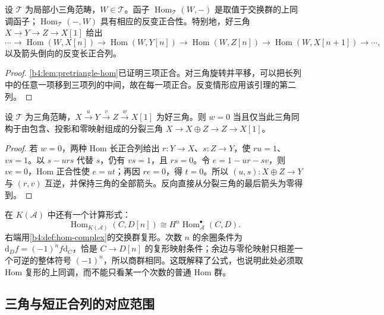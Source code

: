 \begin{proposition}\label{b4:prop:triangle-hom-exact}
设 \(\mathcal T\) 为局部小三角范畴，\(W\in\mathcal T\)。函子 \(\operatorname{Hom}_{\mathcal T}(W,-)\) 是取值于交换群的上同调函子；\(\operatorname{Hom}_{\mathcal T}(-,W)\) 具有相应的反变正合性。特别地，好三角 \(X\to Y\to Z\to X[1]\) 给出
\[
 \cdots\to\operatorname{Hom}(W,X[n])\to\operatorname{Hom}(W,Y[n])
 \to\operatorname{Hom}(W,Z[n])\to\operatorname{Hom}(W,X[n+1])\to\cdots,
\]
以及箭头倒向的反变长正合列。
\end{proposition}
\begin{proof}
\cref{b4:lem:pretriangle-hom}已证明三项正合。对三角旋转并平移，可以把长列中的任意一项移到三项列的中间，故在每一项正合。反变情形应用该引理的第二列。
\end{proof}

\begin{proposition}\label{b4:prop:split-triangle-criterion}
设 \(\mathcal T\) 为三角范畴，\(X\xrightarrow{u}Y\xrightarrow{v}Z\xrightarrow{w}X[1]\) 为好三角。则 \(w=0\) 当且仅当此三角同构于由包含、投影和零映射组成的分裂三角 \(X\to X\oplus Z\to Z\to X[1]\)。
\end{proposition}
\begin{proof}
若 \(w=0\)，两种 Hom 长正合列给出 \(r:Y\to X\)、\(s:Z\to Y\)，使 \(ru=1\)、\(vs=1\)。以 \(s-urs\) 代替 \(s\)，仍有 \(vs=1\)，且 \(rs=0\)。令 \(e=1-ur-sv\)，则 \(ve=0\)，Hom 正合性使 \(e=ut\)；再因 \(re=0\)，得 \(t=0\)。所以 \((u,s):X\oplus Z\to Y\) 与 \((r,v)\) 互逆，并保持三角的全部箭头。反向直接从分裂三角的最后箭头为零得到。
\end{proof}

在 \(K(\mathcal A)\) 中还有一个计算形式：
\[
 \operatorname{Hom}_{K(\mathcal A)}(C,D[n])
 \cong H^n\operatorname{Hom}_{\mathcal A}^{\bullet}(C,D).
\]
右端用\cref{b4:def:hom-complex}的交换群复形。次数 \(n\) 的余圈条件为 \(\mathrm{d}_Df=(-1)^nf\mathrm{d}_C\)，恰是 \(C\to D[n]\) 的复形映射条件；余边与零伦映射只相差一个可逆的整体符号 \((-1)^n\)，所以商群相同。这既解释了公式，也说明此处必须取 Hom 复形的上同调，而不能只看某一个次数的普通 Hom 群。

\subsection{三角与短正合列的对应范围}
\label{b4:subsec:1603:03}

